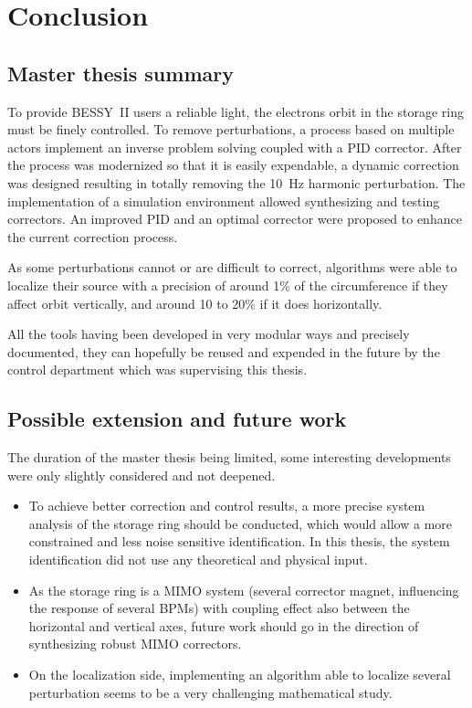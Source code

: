 
\chapter{Conclusion}
\label{sec:conclusion}
\section{Master thesis summary}
To provide BESSY~II users a reliable light, the electrons orbit in the storage ring must be finely controlled. To remove perturbations, a process based on multiple actors implement an inverse problem solving coupled with a PID corrector. After the process was modernized so that it is easily expendable, a dynamic correction was designed resulting in totally removing the \SI{10}{\hertz} harmonic perturbation. The implementation of a simulation environment allowed synthesizing and testing correctors. An improved PID and an optimal corrector were proposed to enhance the current correction process.

As some perturbations cannot or are difficult to correct, algorithms were able to localize their source with a precision of around 1\% of the circumference if they affect orbit vertically, and around 10 to 20\% if it does horizontally.

All the tools having been developed in very modular ways and precisely documented, they can hopefully be reused and expended in the future by the control department which was supervising this thesis.

\section{Possible extension and future work}

The duration of the master thesis being limited, some interesting developments were only slightly considered and not deepened.

\begin{itemize}
    \item To achieve better correction and control results, a more precise system analysis of the storage ring should be conducted, which would allow a more constrained and less noise sensitive identification.  In this thesis, the system identification did not use any theoretical and physical input.
    \item As the storage ring is a MIMO system (several corrector magnet, influencing the response of several BPMs) with coupling effect also between the horizontal and vertical axes, future work should go in the direction of synthesizing robust MIMO correctors.
    \item On the localization side, implementing an algorithm able to localize several perturbation seems to be a very challenging mathematical study.
\end{itemize}